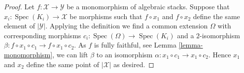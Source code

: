 \documentclass[10pt,a4paper]{amsart}
\theoremstyle{plain}
\theoremstyle{definition}
\theoremstyle{remark}
\numberwithin{equation}{subsection}
\def\Spec{\mathop{\mathrm{Spec}}}
\begin{document}
\begin{proof}
Let $f : \mathcal{X} \to \mathcal{Y}$ be a monomorphism of algebraic stacks.
Suppose that $x_i : \Spec(K_i) \to \mathcal{X}$ be morphisms such that
$f \circ x_1$ and $f \circ x_2$ define the same element of $|\mathcal{Y}|$.
Applying the definition we find a common extension $\Omega$ with corresponding
morphisms $c_i : \Spec(\Omega) \to \Spec(K_i)$ and a
$2$-isomorphism $\beta : f \circ x_1 \circ c_1 \to f \circ x_1 \circ c_2$.
As $f$ is fully faithful, see
Lemma \ref{lemma-monomorphism},
we can lift $\beta$ to an isomorphism
$\alpha : x_1 \circ c_1 \to x_1 \circ c_2$.
Hence $x_1$ and $x_2$ define the same point of $|\mathcal{X}|$
as desired.
\end{proof}
\end{document}

